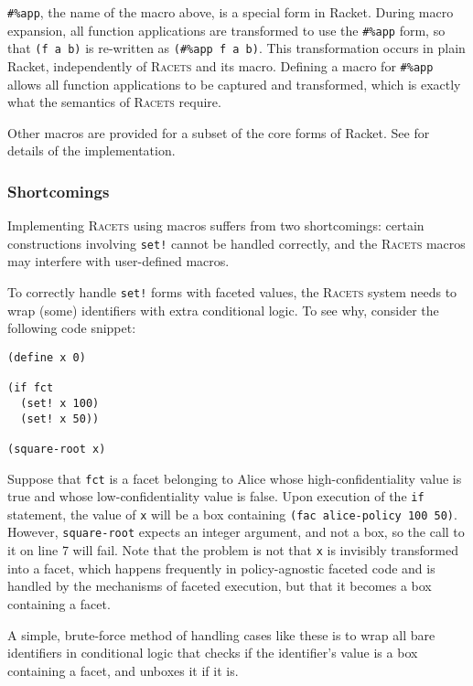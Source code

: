\documentclass{article}
\begin{document}
\texttt{\#\%app}, the name of the macro above, is a special form in Racket. During macro expansion, all function applications are transformed to use the \texttt{\#\%app} form, so that \texttt{(f a b)} is re-written as \texttt{(\#\%app f a b)}. This transformation occurs in plain Racket, independently of \textsc{Racets} and its macro. Defining a macro for \texttt{\#\%app} allows all function applications to be captured and transformed, which is exactly what the semantics of \textsc{Racets} require.

Other macros are provided for a subset of the core forms of Racket. See \cite{racets} for details of the implementation.


\subsubsection{Shortcomings\label{sec:shortcomings}}
Implementing \textsc{Racets} using macros suffers from two shortcomings: certain constructions involving \texttt{set!} cannot be handled correctly, and the \textsc{Racets} macros may interfere with user-defined macros.

To correctly handle \texttt{set!} forms with faceted values, the \textsc{Racets} system needs to wrap (some) identifiers with extra conditional logic. To see why, consider the following code snippet:

\begin{lstlisting}
(define x 0)

(if fct
  (set! x 100)
  (set! x 50))

(square-root x)
\end{lstlisting}

Suppose that \texttt{fct} is a facet belonging to Alice whose high-confidentiality value is true and whose low-confidentiality value is false. Upon execution of the \texttt{if} statement, the value of \texttt{x} will be a box containing \texttt{(fac alice-policy 100 50)}. However, \texttt{square-root} expects an integer argument, and not a box, so the call to it on line 7 will fail. Note that the problem is not that \texttt{x} is invisibly transformed into a facet, which happens frequently in policy-agnostic faceted code and is handled by the mechanisms of faceted execution, but that it becomes a box containing a facet.

A simple, brute-force method of handling cases like these is to wrap all bare identifiers in conditional logic that checks if the identifier's value is a box containing a facet, and unboxes it if it is.
\end{document}
